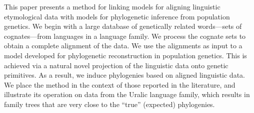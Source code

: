 This paper presents a method for linking models for aligning linguistic etymological data with models for phylogenetic inference from population genetics. We begin with a large database of genetically related words—sets of cognates—from languages in a language family. We process the cognate sets to obtain a complete alignment of the data. We use the alignments as input to a model developed for phylogenetic reconstruction in population genetics. This is achieved via a natural novel projection of the linguistic data onto genetic primitives. As a result, we induce phylogenies based on aligned linguistic data. We place the method in the context of those reported in the literature, and illustrate its operation on data from the Uralic language family, which results in family trees that are very close to the ``true'' (expected) phylogenies.

